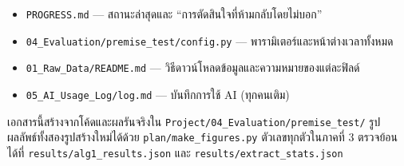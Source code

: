 \documentclass[11pt,a4paper]{article}
\newcommand{\sansall}{\sffamily}
\newcommand{\code}[1]{\texttt{#1}}
\begin{document}
\begin{keybox}[title={เอกสารภายในโครงงานที่ควรอ่านคู่กัน}]
\begin{itemize}
\item \code{PROGRESS.md} --- สถานะล่าสุดและ ``การตัดสินใจที่ห้ามกลับโดยไม่บอก''
\item \code{04\_Evaluation/premise\_test/config.py} --- พารามิเตอร์และหน้าต่างเวลาทั้งหมด
\item \code{01\_Raw\_Data/README.md} --- วิธีดาวน์โหลดข้อมูลและความหมายของแต่ละฟิลด์
\item \code{05\_AI\_Usage\_Log/log.md} --- บันทึกการใช้ AI (ทุกคนเติม)
\end{itemize}
\end{keybox}

\vspace{2em}
\begin{center}
\end{center}
{\sansall\footnotesize\color{muted}
เอกสารนี้สร้างจากโค้ดและผลรันจริงใน \code{Project/04\_Evaluation/premise\_test/}
รูปผลลัพธ์ทั้งสองรูปสร้างใหม่ได้ด้วย \code{plan/make\_figures.py}
ตัวเลขทุกตัวในภาคที่ 3 ตรวจย้อนได้ที่ \code{results/alg1\_results.json}
และ \code{results/extract\_stats.json}\par}
\end{document}

